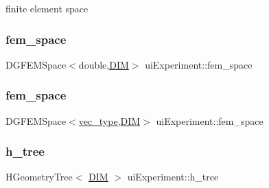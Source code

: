 finite element space 

\mbox{\label{classui_experiment_a7532fa0202196a17b46ea8a3c9241410}} 
\subsubsection{\texorpdfstring{fem\+\_\+space}{fem\_space}\hspace{0.1cm}{\footnotesize\ttfamily [1/2]}}
{\footnotesize\ttfamily D\+G\+F\+E\+M\+Space$<$double,\mbox{\hyperlink{complex__node___t_h_f_e_m_2uiexp_8h_a589b8b9bfdf714f736059845d568b597}{D\+IM}}$>$ ui\+Experiment\+::fem\+\_\+space\hspace{0.3cm}{\ttfamily [private]}}

\mbox{\label{classui_experiment_ad4b0994c9d2bd5691065434080468700}} 
\subsubsection{\texorpdfstring{fem\+\_\+space}{fem\_space}\hspace{0.1cm}{\footnotesize\ttfamily [2/2]}}
{\footnotesize\ttfamily D\+G\+F\+E\+M\+Space$<$\mbox{\hyperlink{complex__edge___t_h_f_e_m_2emdefs_8h_a0a0de407de54661e0d56aa8686c104d9}{vec\+\_\+type}},\mbox{\hyperlink{complex__node___t_h_f_e_m_2uiexp_8h_a589b8b9bfdf714f736059845d568b597}{D\+IM}}$>$ ui\+Experiment\+::fem\+\_\+space\hspace{0.3cm}{\ttfamily [private]}}

\mbox{\label{classui_experiment_a7b3828699381e953e413984d65c27c76}} 
\subsubsection{\texorpdfstring{h\+\_\+tree}{h\_tree}}
{\footnotesize\ttfamily H\+Geometry\+Tree$<$ \mbox{\hyperlink{complex__node___t_h_f_e_m_2uiexp_8h_a589b8b9bfdf714f736059845d568b597}{D\+IM}} $>$ ui\+Experiment\+::h\+\_\+tree\hspace{0.3cm}{\ttfamily [private]}}

